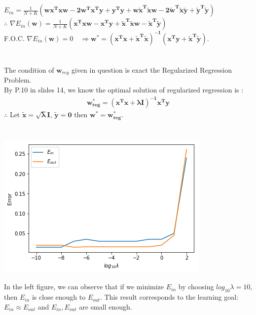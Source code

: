 \documentclass[a4paper,12pt]{article}
\begin{document}
\section{}
$\displaystyle E_{in}= \frac{1}{N+K} (\mathbf{  wx^Txw - 2w^Tx^Ty + y^Ty + w \widetilde{x}^{T} \widetilde{x} w -2 \widetilde{w}^{T} \widetilde{x} \widetilde{y} + \widetilde{y}^{T} \widetilde{y}      } )$ \\
$\therefore$ $\displaystyle \nabla E_{in} (\mathbf{w})=\frac{1}{N+K} (\mathbf{x^Txw - x^Ty + \widetilde{x}^{T} \widetilde{x} w - \widetilde{x}^{T} \widetilde{y}    })$ \\
F.O.C. $\nabla E_{in}(\mathbf{w})=0 \quad \Rightarrow \mathbf{ w^{*} = (x^Tx + \widetilde{x}^{T} \widetilde{x} )^{-1} (x^Ty +\widetilde{x}^{T} \widetilde{y})   }$.


\section{}
The condition of $\mathbf{w}_{reg}$ given in question is exact the Regularized Regression Problem.\\
By P.10 in slides 14, we know the optimal solution of regularized regression is :
\begin{align*} 
  \mathbf{ w_{reg}^{*} = (x^Tx + \lambda I)^{-1} x^Ty  }
\end{align*}
$\therefore$ Let $\mathbf{ \widetilde{x} = \sqrt{\lambda} I }$, $\mathbf{   \widetilde{y}= 0}$ then $\mathbf{ w^{*}=w_{reg}^{*} }$.



\section{}
  \begin{minipage}{\linewidth}
      \begin{minipage}{0.6\linewidth}
\raggedright
\includegraphics[scale=0.7]{Q7.png}
      \end{minipage}
      \hspace{0.05\linewidth}
      \begin{minipage}{0.4\linewidth}
          In the left figure, we can observe that if we minimize $E_{in}$ by choosing $log_{10} \lambda = 10$,  then $E_{in}$ is close enough to $E_{out}$. This result corresponds to the learning goal: $E_{in} \approx E_{out}$ and $E_{in}, E_{out}$ are small enough.
      \end{minipage}
  \end{minipage}
\end{document}

